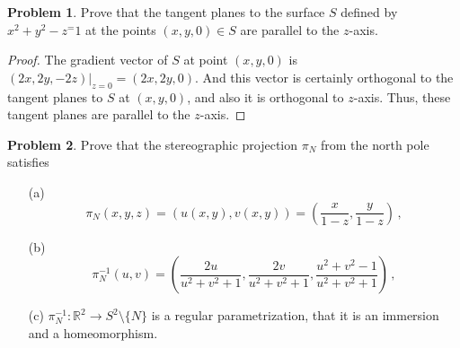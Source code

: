 \documentclass[11pt]{article}
\theoremstyle{definition}
\newtheorem{problem}{Problem}
\theoremstyle{definition}
\begin{document}
\begin{problem}
Prove that the tangent planes to the surface $S$ defined by $x^2 + y^2 - z^ = 1$ at the points $(x,y,0) \in S$ are parallel to the $z$-axis.
\end{problem}
\begin{proof}
The gradient vector of $S$ at point $(x,y,0)$ is $(2x, 2y, -2z)|_{z=0} = (2x,2y,0)$. And this vector is certainly orthogonal to the tangent planes to $S$ at $(x,y,0)$, and also it is orthogonal to $z$-axis. Thus, these tangent planes are parallel to the $z$-axis.
\end{proof}


\medskip


\begin{problem}
Prove that the stereographic projection $\pi_N$ from the north pole satisfies
\begin{enumerate}
	\item[(a)]
	$$
	\pi_N(x,y,z)=(u(x,y),v(x,y))=\left(\frac{x}{1-z},\frac{y}{1-z}\right)\, ,
	$$
	\item[(b)]
	$$
	\pi_N^{-1}(u,v)=\left(\frac{2u}{u^2+v^2+1},\frac{2v}{u^2+v^2+1},\frac{u^2+v^2-1}{u^2+v^2+1}\right)\, ,
	$$
	\item[(c)]
	$\pi_N^{-1}:\mathbb{R}^2\to S^2\setminus\{ N\}$ is a regular parametrization, that it is an immersion and a homeomorphism.
\end{enumerate}
\end{problem}
\end{document}
